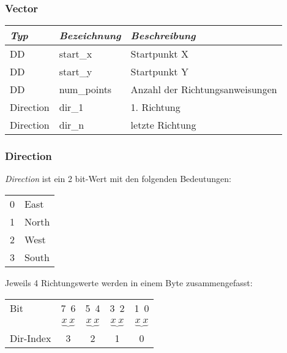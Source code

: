 \subsubsection{Vector}
\begin{tabular}{|l|l|l|}
\hline
\emph{Typ} & \emph{Bezeichnung} & \emph{Beschreibung} \\
\hline
DD & start\_x & Startpunkt X \\
DD & start\_y & Startpunkt Y \\
DD & num\_points & Anzahl der Richtungsanweisungen \\
\hline
Direction & dir\_1 & 1. Richtung \\
Direction & dir\_n & letzte Richtung \\
\hline
\end{tabular}

\subsubsection{Direction}
\emph{Direction} ist ein 2 bit-Wert mit den folgenden Bedeutungen:

\begin{tabular}{ll}
0 & East \\
1 & North \\
2 & West \\
3 & South \\
\end{tabular}

Jeweils 4 Richtungswerte werden in einem Byte zusammengefasst:

\begin{tabular}{lc@{}c@{}c@{}c}
Bit&7\ 6&5\ 4&3\ 2&1\ 0\\
&$\underbrace{x\ x}$&$\underbrace{x\ x}$&$\underbrace{x\ x}$&$\underbrace{x\ x}$\\
Dir-Index&3 &2 &1 &0 \\
\end{tabular}
